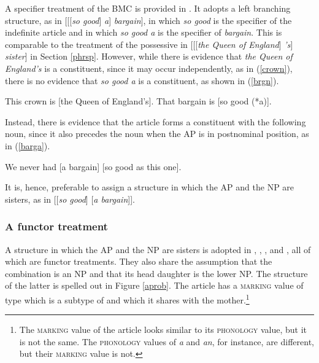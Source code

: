 \documentclass[output=paper
                ,modfonts
                ,nonflat
	        ,collection
	        ,collectionchapter
	        ,collectiontoclongg
 	        ,biblatex
                ,babelshorthands
                ,newtxmath
                ,draftmode
                ,colorlinks, citecolor=brown
]{./langsci/langscibook}
\begin{document}
A specifier treatment of the BMC is provided in \citet[201]{GS00}. It adopts  
a left branching structure, as in [[[\emph{so good}] \emph{a}] \emph{bargain}], 
in which \emph{so good} is the specifier of the indefinite article and in which 
\emph{so good a} is the specifier of \emph{bargain}. 
This is comparable to the treatment of the possessive in 
[[[\emph{the Queen of England}] \emph{'s}] \emph{sister}] in Section \ref{phrsp}.  
However, while there is evidence that \emph{the Queen of England's} is a constituent,
since it may occur independently, as in (\ref{crown}), there is no evidence that 
\emph{so good a} is a constituent, as shown in (\ref{brgn}).

\begin{exe} 
\ex\label{crown}  This crown is [the Queen of England's].
\ex\label{brgn}   That bargain is [so good (*a)]. 
\end{exe} 

\noindent
Instead, there is evidence that the article forms a constituent with the following noun, 
since it also precedes the noun when the AP is in postnominal position, as in (\ref{barga}). 

\begin{exe} 
\ex\label{barga}  We never had [a bargain] [so good as this one].
\end{exe} 

\noindent
It is, hence, preferable to assign a structure in which the AP and the NP are sisters, as in  
[[\emph{so good}] [\emph{a bargain}]]. 


\subsubsection{A functor treatment} 


A structure in which the AP and the NP are sisters 
is adopted in \citet{VanEynde07}, \citet{KimSells11}, \citet{KaySag12}, 
\citet{ArnoldSadler14} and \citet{VanEynde18}, all of which are functor treatments. 
They also share the assumption that the combination is an NP and that its head daughter is 
the lower NP. The structure of the latter is spelled out in Figure \ref{aprob}. 
The article has a \textsc{marking} value of type  which is a subtype of  and which it
shares with the mother.\footnote{The \textsc{marking} value of the article looks similar to its 
\textsc{phonology} value, but it is not the same. The \textsc{phonology} values of \emph{a} and \emph{an}, 
for instance, are different, but their \textsc{marking} value is not.} 
\end{document}
